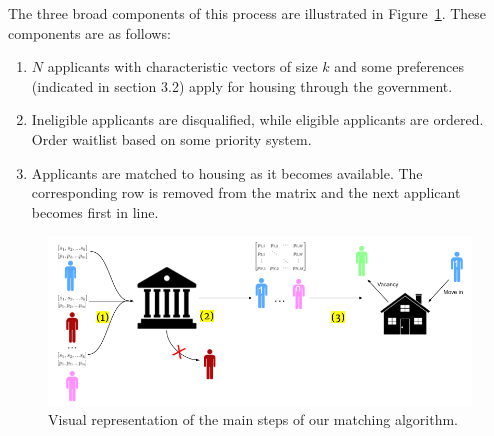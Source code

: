 \documentclass[11pt]{article}
\begin{document}
The three broad components of this process are illustrated in Figure~\ref{fig:schematic}.
These components are as follows:
\begin{enumerate}
    \item $N$ applicants with characteristic vectors of size $k$ and some preferences (indicated in section 3.2) apply for housing through the government. 
    \item Ineligible applicants are disqualified, while eligible applicants are ordered. Order waitlist based on some priority system.
    \item Applicants are matched to housing as it becomes available. The corresponding row is removed from the matrix and the next applicant becomes first in line.
\end{enumerate}
\begin{figure}[h!]
    \includegraphics[scale=0.65]{doc/Setup Image.png}
    \caption{Visual representation of the main steps of our matching algorithm.}
    \label{fig:schematic}
\end{figure}
\end{document}

